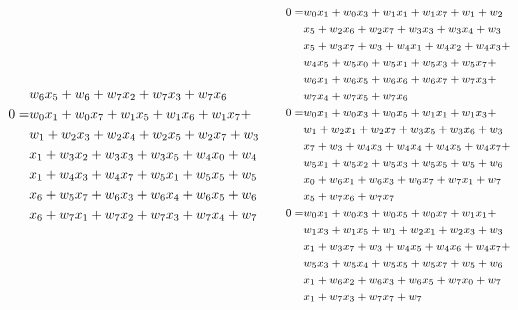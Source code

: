 \begin{equation*}
{\begin{split}
	&w_{6} x_{5} + w_{6} + w_{7} x_{2} + w_{7} x_{3} + w_{7} x_{6}\\
	0 =& w_{0} x_{1} + w_{0} x_{7} + w_{1} x_{5} + w_{1} x_{6} + w_{1} x_{7} +\\
	&w_{1} + w_{2} x_{3} + w_{2} x_{4} + w_{2} x_{5} + w_{2} x_{7} + w_{3}\\
	&x_{1} + w_{3} x_{2} + w_{3} x_{3} + w_{3} x_{5} + w_{4} x_{0} + w_{4}\\
	&x_{1} + w_{4} x_{3} + w_{4} x_{7} + w_{5} x_{1} + w_{5} x_{5} + w_{5}\\
	&x_{6} + w_{5} x_{7} + w_{6} x_{3} + w_{6} x_{4} + w_{6} x_{5} + w_{6}\\
	&x_{6} + w_{7} x_{1} + w_{7} x_{2} + w_{7} x_{3} + w_{7} x_{4} + w_{7}\\
	\end{split}}
\quad\quad
{\footnotesize\begin{split}
	0 =& w_{0} x_{1} + w_{0} x_{3} + w_{1} x_{1} + w_{1} x_{7} + w_{1} + w_{2}\\
	&x_{5} + w_{2} x_{6} + w_{2} x_{7} + w_{3} x_{3} + w_{3} x_{4} + w_{3}\\
	&x_{5} + w_{3} x_{7} + w_{3} + w_{4} x_{1} + w_{4} x_{2} + w_{4} x_{3} +\\
	&w_{4} x_{5} + w_{5} x_{0} + w_{5} x_{1} + w_{5} x_{3} + w_{5} x_{7} +\\
	&w_{6} x_{1} + w_{6} x_{5} + w_{6} x_{6} + w_{6} x_{7} + w_{7} x_{3} +\\
	&w_{7} x_{4} + w_{7} x_{5} + w_{7} x_{6}\\
	0 =& w_{0} x_{1} + w_{0} x_{3} + w_{0} x_{5} + w_{1} x_{1} + w_{1} x_{3} +\\
	&w_{1} + w_{2} x_{1} + w_{2} x_{7} + w_{3} x_{5} + w_{3} x_{6} + w_{3}\\
	&x_{7} + w_{3} + w_{4} x_{3} + w_{4} x_{4} + w_{4} x_{5} + w_{4} x_{7} +\\
	&w_{5} x_{1} + w_{5} x_{2} + w_{5} x_{3} + w_{5} x_{5} + w_{5} + w_{6}\\
	&x_{0} + w_{6} x_{1} + w_{6} x_{3} + w_{6} x_{7} + w_{7} x_{1} + w_{7}\\
	&x_{5} + w_{7} x_{6} + w_{7} x_{7}\\
	0 =& w_{0} x_{1} + w_{0} x_{3} + w_{0} x_{5} + w_{0} x_{7} + w_{1} x_{1} +\\
	&w_{1} x_{3} + w_{1} x_{5} + w_{1} + w_{2} x_{1} + w_{2} x_{3} + w_{3}\\
	&x_{1} + w_{3} x_{7} + w_{3} + w_{4} x_{5} + w_{4} x_{6} + w_{4} x_{7} +\\
	&w_{5} x_{3} + w_{5} x_{4} + w_{5} x_{5} + w_{5} x_{7} + w_{5} + w_{6}\\
	&x_{1} + w_{6} x_{2} + w_{6} x_{3} + w_{6} x_{5} + w_{7} x_{0} + w_{7}\\
	&x_{1} + w_{7} x_{3} + w_{7} x_{7} + w_{7}\\
	\end{split}}
\end{equation*}
